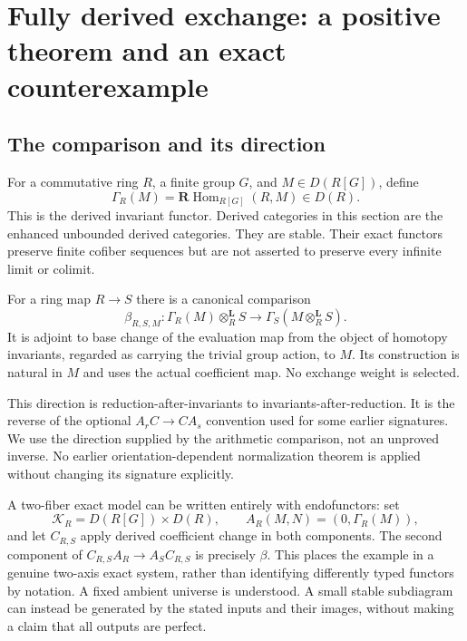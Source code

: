 \section{Fully derived exchange: a positive theorem and an exact counterexample}\label{sec:derived-invariant-exchange}

\subsection{The comparison and its direction}

For a commutative ring $R$, a finite group $G$, and $M\in D(R[G])$, define
\[
 \Gamma_R(M)=\mathbf R\operatorname{Hom}_{R[G]}(R,M)\in D(R).
\]
This is the derived invariant functor. Derived categories in this section are the enhanced unbounded derived categories. They are stable. Their exact functors preserve finite cofiber sequences but are not asserted to preserve every infinite limit or colimit.

For a ring map $R\to S$ there is a canonical comparison
\[
 \boxed{\beta_{R,S,M}:\Gamma_R(M)\otimes_R^{\mathbf L}S
 \longrightarrow\Gamma_S(M\otimes_R^{\mathbf L}S).}
\]
It is adjoint to base change of the evaluation map from the object of homotopy invariants, regarded as carrying the trivial group action, to $M$. Its construction is natural in $M$ and uses the actual coefficient map. No exchange weight is selected.

This direction is reduction-after-invariants to invariants-after-reduction. It is the reverse of the optional $A_rC\to CA_s$ convention used for some earlier signatures. We use the direction supplied by the arithmetic comparison, not an unproved inverse. No earlier orientation-dependent normalization theorem is applied without changing its signature explicitly.

A two-fiber exact model can be written entirely with endofunctors: set
\[
 \mathcal K_R=D(R[G])\times D(R),\qquad
 A_R(M,N)=(0,\Gamma_R(M)),
\]
and let $C_{R,S}$ apply derived coefficient change in both components. The second component of $C_{R,S}A_R\to A_SC_{R,S}$ is precisely $\beta$. This places the example in a genuine two-axis exact system, rather than identifying differently typed functors by notation. A fixed ambient universe is understood. A small stable subdiagram can instead be generated by the stated inputs and their images, without making a claim that all outputs are perfect.

